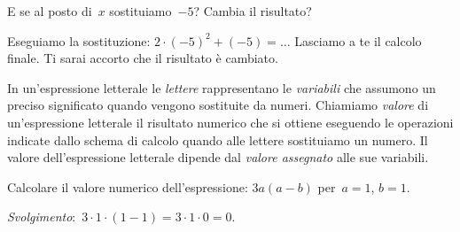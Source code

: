 E se al posto di~\(x\) sostituiamo~\(-5\)? Cambia il risultato?

Eseguiamo la sostituzione:  \(2\cdot (-5)^{2}+(-5)=\ldots\) Lasciamo a te il 
calcolo finale. Ti sarai accorto che il risultato è cambiato.

 \begin{definizione}
In un'espressione letterale le \emph{lettere} rappresentano 
le \emph{variabili} che assumono un preciso significato quando vengono 
sostituite da numeri.
Chiamiamo \emph{valore} di un'espressione letterale il risultato numerico 
che si ottiene eseguendo le operazioni indicate dallo
schema di calcolo quando alle lettere sostituiamo un numero. 
Il valore dell'espressione letterale dipende dal \emph{valore assegnato} 
alle sue variabili.
\end{definizione}

 \begin{esempio}
Calcolare il valore numerico dell'espressione:
\(3a(a-b)\) per~\(a = 1\), \(b = 1\).

\emph{Svolgimento}:~\(3\cdot 1\cdot (1-1)=3\cdot 1\cdot 0=0\).
\end{esempio}


